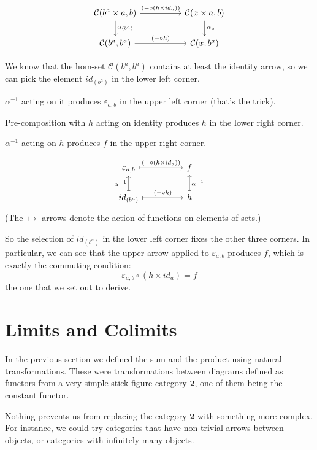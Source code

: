 \documentclass[DaoFP]{subfiles}
\begin{document}
\[
 \begin{tikzcd}
 \mathcal{C}(b^a \times a, b)
 \arrow[rr, "(- \circ (h \times id_a))"]
 \arrow[d,  "\alpha_{(b^a)}"]
& &
\mathcal{C}(x \times a, b)
  \arrow[d,  "\alpha_x"]
 \\
 \mathcal{C}(b^a, b^a)
 \arrow[rr, "(- \circ h)"]
& &
\mathcal{C}(x, b^a)
 \end{tikzcd}
\]

We know that the hom-set $\mathcal{C}(b^a, b^a)$ contains at least the identity arrow, so we can pick the element $id_{(b^a)}$ in the lower left corner. 

$\alpha^{-1}$ acting on it produces $\varepsilon_{a, b}$ in the upper left corner (that's the  trick). 

Pre-composition with $h$ acting on identity produces $h$ in the lower right corner. 

$\alpha^{-1}$ acting on $h$ produces $f$ in the upper right corner. 

\[
 \begin{tikzcd}[
  every arrow/.style={draw,mapsto}
]
 \varepsilon_{a, b}
 \arrow[rr, "(- \circ (h \times id_a))"]
& &
f
 \\
 id_{(b^a)}
 \arrow[u, "\alpha^{-1}"]
 \arrow[rr, "(- \circ h)"]
& &
h
\arrow[u, "\alpha^{-1}"']
 \end{tikzcd}
\]
(The $\mapsto$ arrows denote the action of functions on elements of sets.)


So the selection of $id_{(b^a)}$ in the lower left corner fixes the other three corners. In particular, we can see that the upper arrow applied to $\varepsilon_{a, b}$ produces $f$, which is exactly the commuting condition:
\[ \varepsilon_{a, b} \circ (h \times id_a) = f \]
the one that we set out to derive.

\section{Limits and Colimits}

In the previous section we defined the sum and the product using natural transformations. These were transformations between diagrams defined as functors from a very simple stick-figure category $\mathbf{2}$, one of them being the constant functor. 

Nothing prevents us from replacing the category $\mathbf{2}$ with something more complex. For instance, we could try categories that have non-trivial arrows between objects, or categories with infinitely many objects. 
\end{document}
